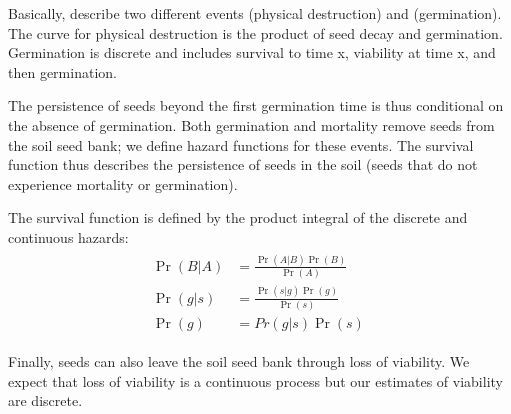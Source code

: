 \documentclass[12pt, oneside, titlepage]{article}   	%
\begin{document}
Basically, describe two different events (physical destruction) and (germination). The curve for physical destruction is the product of seed decay and germination. Germination is discrete and includes survival to time x, viability at time x, and then germination. 

The persistence of seeds beyond the first germination time is thus conditional on the absence of germination. Both germination and mortality remove seeds from the soil seed bank; we define hazard functions for these events. The survival function thus describes the persistence of seeds in the soil (seeds that do not experience mortality or germination).

The survival function is defined by the product integral of the discrete and continuous hazards:
%
\begin{align}
  \begin{split}
\Pr( B|A )  & = \frac{\Pr( A|B ) \Pr( B )}{ \Pr ( A )} \\
\Pr( g | s )  & = \frac{\Pr( s | g ) \Pr( g )}{ \Pr ( s )} \\ 
 \Pr( g ) & = Pr( g | s ) \Pr( s ) \
  \end{split}
\end{align}
%

Finally, seeds can also leave the soil seed bank through loss of viability. We expect that loss of viability is a continuous process but our estimates of viability are discrete.











%
\end{document}
